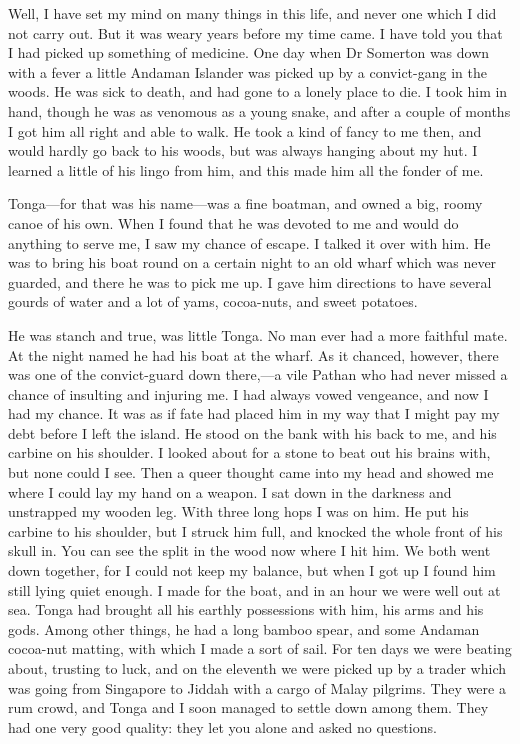 Well, I have set my mind on many things in this life, and never one which I did not carry out. But it was weary years before my time came. I have told you that I had picked up something of medicine. One day when Dr Somerton was down with a fever a little Andaman Islander was picked up by a convict-gang in the woods. He was sick to death, and had gone to a lonely place to die. I took him in hand, though he was as venomous as a young snake, and after a couple of months I got him all right and able to walk. He took a kind of fancy to me then, and would hardly go back to his woods, but was always hanging about my hut. I learned a little of his lingo from him, and this made him all the fonder of me.

Tonga—for that was his name—was a fine boatman, and owned a big, roomy canoe of his own. When I found that he was devoted to me and would do anything to serve me, I saw my chance of escape. I talked it over with him. He was to bring his boat round on a certain night to an old wharf which was never guarded, and there he was to pick me up. I gave him directions to have several gourds of water and a lot of yams, cocoa-nuts, and sweet potatoes.

He was stanch and true, was little Tonga. No man ever had a more faithful mate. At the night named he had his boat at the wharf. As it chanced, however, there was one of the convict-guard down there,—a vile Pathan who had never missed a chance of insulting and injuring me. I had always vowed vengeance, and now I had my chance. It was as if fate had placed him in my way that I might pay my debt before I left the island. He stood on the bank with his back to me, and his carbine on his shoulder. I looked about for a stone to beat out his brains with, but none could I see. Then a queer thought came into my head and showed me where I could lay my hand on a weapon. I sat down in the darkness and unstrapped my wooden leg. With three long hops I was on him. He put his carbine to his shoulder, but I struck him full, and knocked the whole front of his skull in. You can see the split in the wood now where I hit him. We both went down together, for I could not keep my balance, but when I got up I found him still lying quiet enough. I made for the boat, and in an hour we were well out at sea. Tonga had brought all his earthly possessions with him, his arms and his gods. Among other things, he had a long bamboo spear, and some Andaman cocoa-nut matting, with which I made a sort of sail. For ten days we were beating about, trusting to luck, and on the eleventh we were picked up by a trader which was going from Singapore to Jiddah with a cargo of Malay pilgrims. They were a rum crowd, and Tonga and I soon managed to settle down among them. They had one very good quality: they let you alone and asked no questions.

